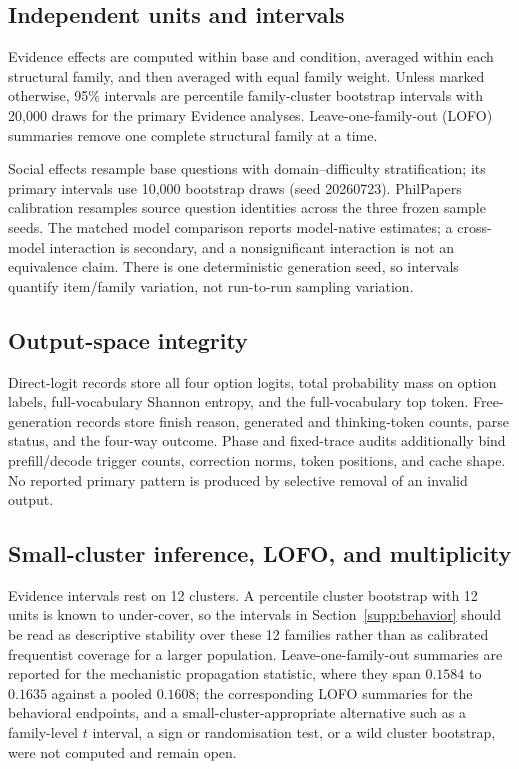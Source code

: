 \documentclass[letterpaper]{article}
\begin{document}
\subsection{Independent units and intervals}

Evidence effects are computed within base and condition, averaged within each structural family, and then averaged with equal family weight.  Unless marked otherwise, 95\% intervals are percentile family-cluster bootstrap intervals with 20,000 draws for the primary Evidence analyses.  Leave-one-family-out (LOFO) summaries remove one complete structural family at a time.

Social effects resample base questions with domain--difficulty stratification; its primary intervals use 10,000 bootstrap draws (seed 20260723).  PhilPapers calibration resamples source question identities across the three frozen sample seeds.  The matched model comparison reports model-native estimates; a cross-model interaction is secondary, and a nonsignificant interaction is not an equivalence claim.  There is one deterministic generation seed, so intervals quantify item/family variation, not run-to-run sampling variation.

\subsection{Output-space integrity}

Direct-logit records store all four option logits, total probability mass on option labels, full-vocabulary Shannon entropy, and the full-vocabulary top token.  Free-generation records store finish reason, generated and thinking-token counts, parse status, and the four-way outcome.  Phase and fixed-trace audits additionally bind prefill/decode trigger counts, correction norms, token positions, and cache shape.  No reported primary pattern is produced by selective removal of an invalid output.

\subsection{Small-cluster inference, LOFO, and multiplicity}

Evidence intervals rest on 12 clusters. A percentile cluster bootstrap with 12 units is known to under-cover, so the intervals in Section~\ref{supp:behavior} should be read as descriptive stability over these 12 families rather than as calibrated frequentist coverage for a larger population. Leave-one-family-out summaries are reported for the mechanistic propagation statistic, where they span $0.1584$ to $0.1635$ against a pooled $0.1608$; the corresponding LOFO summaries for the behavioral endpoints, and a small-cluster-appropriate alternative such as a family-level $t$ interval, a sign or randomisation test, or a wild cluster bootstrap, were not computed and remain open.
\end{document}

